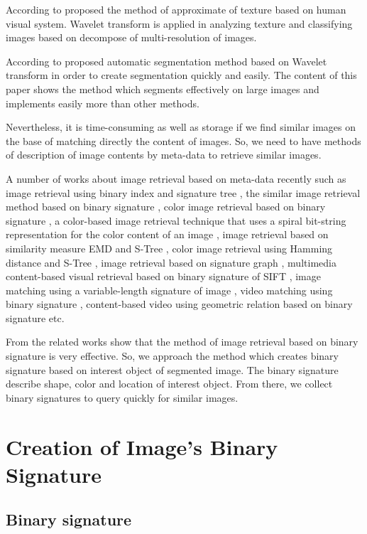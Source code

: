 \documentclass{amcs}
\begin{document}
According to \cite{Acharya:05} proposed the method of approximate of texture based on human visual system. Wavelet transform is applied in analyzing texture and classifying images based on decompose of multi-resolution of images.

According to \cite{Kumar:09} proposed automatic segmentation method based on Wavelet transform in order to create segmentation quickly and easily. The content of this paper shows the method which segments effectively on large images and implements easily more than other methods.

Nevertheless, it is time-consuming as well as storage if we find similar images on the base of matching directly the content of images. So, we need to have methods of description of image contents by meta-data to retrieve similar images. 

A number of works about image retrieval based on meta-data recently such as image retrieval using binary index and signature tree \cite{Yannis:03}, the similar image retrieval method based on binary signature \cite{Chappell:13}, color image retrieval based on binary signature \cite{Nascimento:02}, a color-based image retrieval technique that uses a spiral bit-string representation for the color content of an image \cite{Abdesselam:10}, image retrieval based on similarity measure EMD and S-Tree \cite{Thanh:2013}, color image retrieval using Hamming distance and S-Tree \cite{Thanh:2014}, image retrieval based on signature graph \cite{Thanh:2014a,Thanh:2014b}, multimedia content-based visual retrieval based on binary signature of SIFT \cite{Zhou:14}, image matching using a variable-length signature of image \cite{Liu:15}, video matching using binary signature \cite{Li:2005}, content-based video using geometric relation based on binary signature \cite{Ozkan:2014} etc.

From the related works show that the method of image retrieval based on binary signature is very effective. So, we approach the method which creates binary signature based on interest object of segmented image. The binary signature describe shape, color and location of interest object. From there, we collect binary signatures to query quickly for similar images.

\section{Creation of Image's Binary Signature}
\label{Binary Signature}
\subsection{Binary signature}
\end{document}
